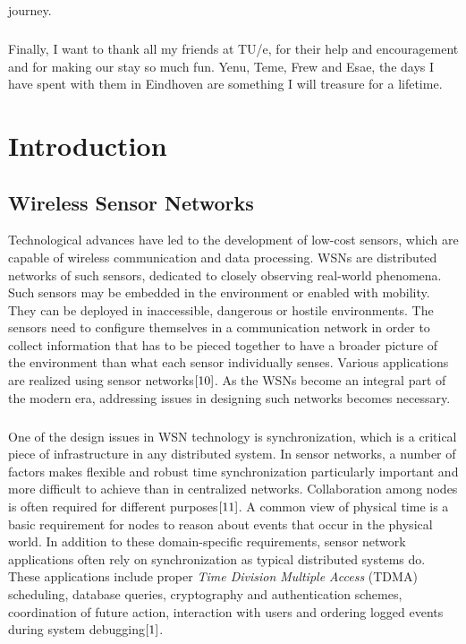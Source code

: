 \documentclass[a4paper,10pt]{report}
\begin{document}
journey.\paragraph*{}Finally, I want to thank all my friends at TU/e, for their help and encouragement and for making our stay so much fun. Yenu, Teme, Frew and Esae, the days I have spent with them in Eindhoven are something I will treasure for a lifetime.
\newpage
{}
\tableofcontents
{}
\listoffigures
{}
\printnomenclature[3.5cm]
\chapter{\textbf{Introduction}}
\section{\textbf{Wireless Sensor Networks}}\par
Technological advances have led to the development of low-cost sensors, which are capable of wireless communication and
data processing. WSNs are distributed networks of such sensors, dedicated to closely observing
real-world phenomena. Such sensors may be embedded in the environment or enabled with mobility. They can be deployed in
inaccessible, dangerous or hostile environments. The sensors need to configure themselves in a communication network in order to collect
information that has to be pieced together to have a broader picture of the environment than what each sensor individually
senses. Various applications are realized using sensor networks$\cite{10}$. As the WSNs become an integral part of the modern era, addressing issues in designing such networks becomes necessary.
\paragraph*{} One of the design issues in WSN technology is synchronization, which is a critical piece of infrastructure in any
distributed system. In sensor networks, a number of factors makes flexible and robust time synchronization particularly important and
more difficult to achieve than in centralized networks.
Collaboration among nodes is often required for different purposes$\cite{11}$. A common view of physical time is a basic requirement for nodes to reason about events that occur in the physical world. In addition to these domain-specific requirements, sensor network applications often rely on synchronization as typical distributed systems do. These applications include proper \textit{Time Division Multiple Access} (TDMA) scheduling, database queries, cryptography and authentication schemes, coordination of future action, interaction with users and ordering logged events during system debugging$\cite{1}$.
\end{document}
